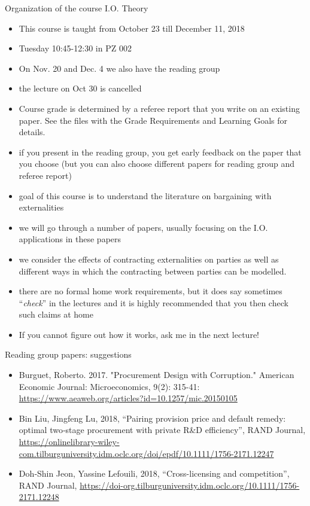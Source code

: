 \documentclass[11pt,english]{beamer}
\begin{document}
\begin{frame}[allowframebreaks]{Organization of the course I.O. Theory}
  \begin{itemize}
  \item This course is taught from October 23 till December 11, 2018
  \item Tuesday 10:45-12:30 in PZ 002
  \item On Nov. 20 and Dec. 4 we also have the reading group
  \item the lecture on Oct 30 is cancelled  
  \item Course grade is determined by a referee report that you write
    on an existing paper. See the files with the Grade Requirements
    and Learning Goals for details.
  \item if you present in the reading group, you get early feedback on the paper
    that you choose (but you can also choose different papers for reading group and referee report)
  \item goal of this course is to understand the literature on
    bargaining with externalities
  \item we will go through a number of papers, usually focusing on the
    I.O. applications in these papers
  \item we consider the effects of contracting externalities on
    parties as well as different ways in which the contracting between
    parties can be modelled.
  \item there are no formal home work requirements, but it does say
    sometimes ``\emph{check}'' in the lectures and it is highly recommended
    that you then check such claims at home
  \item If you cannot figure out how it works, ask me in the next
    lecture!
  \end{itemize}
\end{frame}

\begin{frame}{Reading group papers: suggestions}
  \begin{itemize}
  \item Burguet, Roberto. 2017. "Procurement Design with Corruption." American Economic Journal: Microeconomics, 9(2): 315-41: \url{https://www.aeaweb.org/articles?id=10.1257/mic.20150105}
  \item Bin Liu, Jingfeng Lu, 2018, ``Pairing provision price and default remedy: optimal two‐stage procurement with private R\&D efficiency'', RAND Journal, 
\url{https://onlinelibrary-wiley-com.tilburguniversity.idm.oclc.org/doi/epdf/10.1111/1756-2171.12247}
  \item Doh‐Shin Jeon, Yassine Lefouili, 2018, ``Cross-licensing and competition'', RAND Journal, \url{https://doi-org.tilburguniversity.idm.oclc.org/10.1111/1756-2171.12248}
  \end{itemize}
\end{frame}
\end{document}
